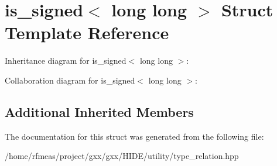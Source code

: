 \hypertarget{structis__signed_3_01long_01long_01_4}{}\section{is\+\_\+signed$<$ long long $>$ Struct Template Reference}
\label{structis__signed_3_01long_01long_01_4}


Inheritance diagram for is\+\_\+signed$<$ long long $>$\+:


Collaboration diagram for is\+\_\+signed$<$ long long $>$\+:
\subsection*{Additional Inherited Members}


The documentation for this struct was generated from the following file\+:\begin{DoxyCompactItemize}
\item 
/home/rfmeas/project/gxx/gxx/\+H\+I\+D\+E/utility/type\+\_\+relation.\+hpp\end{DoxyCompactItemize}
